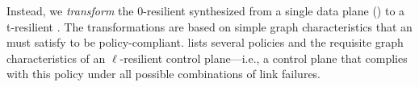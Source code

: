 


Instead, we {\em transform} the 0-resilient \ARC synthesized from a single
data plane () to a t-resilient \ARC.
The transformations are based on simple graph characteristics that an \ARC
must satisfy to be policy-compliant.  
lists several policies and the requisite graph characteristics of an
$\ell$-resilient control plane---i.e., a control plane that complies with this
policy under all possible combinations of link failures. 

